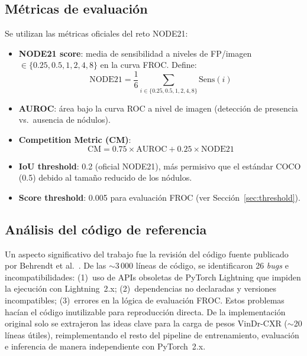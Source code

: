 \documentclass[conference]{IEEEtran}
\begin{document}
\subsection{M\'{e}tricas de evaluaci\'{o}n}

Se utilizan las m\'{e}tricas oficiales del reto NODE21:
\begin{itemize}
\item \textbf{NODE21 score}: media de sensibilidad a niveles de FP/imagen
$\in \{0.25, 0.5, 1, 2, 4, 8\}$ en la curva FROC. Define:
\begin{equation}
\text{NODE21} = \frac{1}{6}\sum_{i \in \{0.25, 0.5, 1, 2, 4, 8\}} \text{Sens}(i)
\end{equation}
\item \textbf{AUROC}: \'{a}rea bajo la curva ROC a nivel de imagen (detecci\'{o}n
de presencia vs.\ ausencia de n\'{o}dulos).
\item \textbf{Competition Metric (CM)}:
\begin{equation}
\text{CM} = 0.75 \times \text{AUROC} + 0.25 \times \text{NODE21}
\end{equation}
\item \textbf{IoU threshold}: 0.2 (oficial NODE21), m\'{a}s permisivo que el
est\'{a}ndar COCO (0.5) debido al tama\~{n}o reducido de los n\'{o}dulos.
\item \textbf{Score threshold}: 0.005 para evaluaci\'{o}n FROC (ver
Secci\'{o}n~\ref{sec:threshold}).
\end{itemize}


\subsection{An\'{a}lisis del c\'{o}digo de referencia}

Un aspecto significativo del trabajo fue la revisi\'{o}n del c\'{o}digo fuente
publicado por Behrendt et al.~\cite{behrendt2023node21}. De las $\sim$3\,000
l\'{i}neas de c\'{o}digo, se identificaron 26 \textit{bugs} e
incompatibilidades: (1)~uso de APIs obsoletas de PyTorch Lightning que
impiden la ejecuci\'{o}n con Lightning~2.x; (2)~dependencias no declaradas y
versiones incompatibles; (3)~errores en la l\'{o}gica de evaluaci\'{o}n FROC.
Estos problemas hac\'{i}an el c\'{o}digo inutilizable para reproducci\'{o}n
directa. De la implementaci\'{o}n original solo se extrajeron las ideas clave
para la carga de pesos VinDr-CXR ($\sim$20 l\'{i}neas \'{u}tiles),
reimplementando el resto del pipeline de entrenamiento, evaluaci\'{o}n e
inferencia de manera independiente con PyTorch~2.x.
\end{document}
